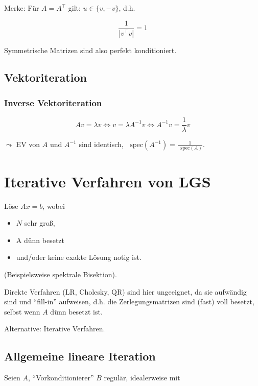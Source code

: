 \documentclass[a4paper, 14pt]{article}
\newcommand*\Spektrum{\mathop{}\!\mathrm{spec}}
\begin{document}
	Merke: Für $A = A^\top$ gilt: $u \in \{ v, -v \}$, d.h.
	
	\begin{equation}
		\frac{1}{|v^\top v|} = 1
	\end{equation}

	Symmetrische Matrizen sind also perfekt konditioniert.

	\subsection{Vektoriteration}

	\subsubsection{Inverse Vektoriteration}

	\begin{equation}
		A v = \lambda v \Leftrightarrow v = \lambda A^{-1} v \Leftrightarrow A^{-1} v = \frac{1}{\lambda} v
	\end{equation}

	$\leadsto$ EV von $A$ und $A^{-1}$ sind identisch, $\Spektrum(A^{-1}) = \frac{1}{\Spektrum(A)}$.

	\section{Iterative Verfahren von LGS}

	Löse $Ax = b$, wobei

	\begin{itemize}
		\item $N$ sehr groß,
		\item A dünn besetzt
		\item und/oder keine exakte Lösung notig ist.
	\end{itemize}

	(Beispielsweise spektrale Bisektion).

	Direkte Verfahren (LR, Cholesky, QR) sind hier ungeeignet, da sie aufwändig sind und \enquote{fill-in} aufweisen, d.h. die Zerlegungsmatrizen sind (fast) voll besetzt, selbst wenn $A$ dünn besetzt ist.

	Alternative: Iterative Verfahren.

	\subsection{Allgemeine lineare Iteration}

	Seien $A$, \enquote{Vorkonditionierer} $B$ regulär, idealerweise mit
\end{document}
